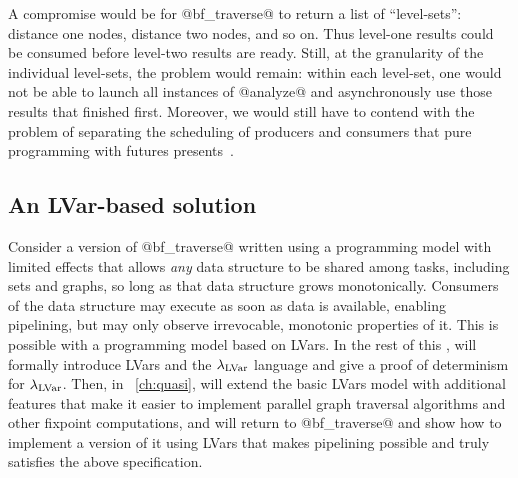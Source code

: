 A compromise would be for @bf_traverse@ to return a list of
``level-sets'': distance one nodes, distance two nodes, and so on.
Thus level-one results could be consumed before level-two results are
ready.  Still, at the granularity of the individual level-sets, the
problem would remain: within each level-set, one would not be able to
launch all instances of @analyze@ and asynchronously use those results
that finished first.  Moreover, we would still have to contend with
the problem of separating the scheduling of producers and consumers
that pure programming with futures presents~\cite{monad-par}.

\subsection{An LVar-based solution}

Consider a version of @bf_traverse@ written using a programming model
with limited effects that allows \emph{any} data structure to be
shared among tasks, including sets and graphs, so long as that data
structure grows monotonically.  Consumers of the data structure may
execute as soon as data is available, enabling pipelining, but may
only observe irrevocable, monotonic properties of it. This is possible
with a programming model based on LVars.  In the rest of this ,
 will formally introduce LVars and the $\lambda_{\textrm{LVar}}$ language and
give a proof of determinism for $\lambda_{\textrm{LVar}}$.  Then, in
~\ref{ch:quasi},  will extend the basic LVars model with
additional features that make it easier to implement parallel graph
traversal algorithms and other fixpoint computations, and  will
return to @bf_traverse@ and show how to implement a version of it
using LVars that makes pipelining possible and truly satisfies the
above specification.

